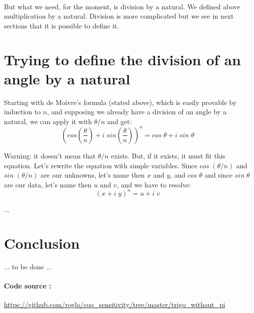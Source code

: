 \documentclass[11pt]{article}
\theoremstyle{definition}
\begin{document}
\

\noindent But what we need, for the moment, is division by a
natural. We defined above multiplication by a natural. Division is
more complicated but we see in next sections that it is possible to
define it.

\section{Trying to define the division of an angle by a natural}

Starting with de Moivre's formula (stated above), which is easily
provable by induction to $n$, and supposing we already have a division
of an angle by a natural, we can apply it with $\theta / n$ and get:
\[
(cos \left(\frac{\theta}{n}\right) + i \; sin
\left(\frac{\theta}{n}\right))^n = cos \; \theta + i \; sin \;
\theta
\]

Warning: it doesn't mean that $\theta / n$ exists. But, if it exists,
it must fit this equation. Let's rewrite the equation with simple
variables. Since $cos\;(\theta/n)$ and $sin\;(\theta/n)$ are our
unknowns, let's name then $x$ and $y$, and $cos\;\theta$ and since
$sin\;\theta$ are our data, let's name then $u$ and $v$, and we have
to resolve:
\[
(x + i \; y)^n = u + i \; v
\]

...

\section{Conclusion}

... to be done ...

\paragraph{Code source :}
\url{https://github.com/roglo/coq_sensitivity/tree/master/trigo_without_pi}
\end{document}
